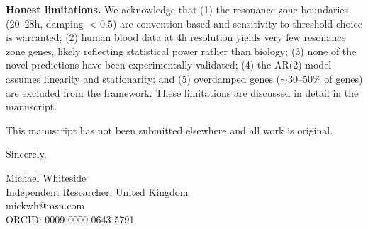 \documentclass[11pt,letterpaper]{article}
\begin{document}
\vspace{0.3cm}

\textbf{Honest limitations.} We acknowledge that (1) the resonance zone boundaries (20--28h, damping $< 0.5$) are convention-based and sensitivity to threshold choice is warranted; (2) human blood data at 4h resolution yields very few resonance zone genes, likely reflecting statistical power rather than biology; (3) none of the novel predictions have been experimentally validated; (4) the AR(2) model assumes linearity and stationarity; and (5) overdamped genes ($\sim$30--50\% of genes) are excluded from the framework. These limitations are discussed in detail in the manuscript.

\vspace{0.3cm}

This manuscript has not been submitted elsewhere and all work is original.

\vspace{0.5cm}

Sincerely,

\vspace{0.5cm}

Michael Whiteside \\
Independent Researcher, United Kingdom \\
mickwh@msn.com \\
ORCID: 0009-0000-0643-5791
\end{document}

